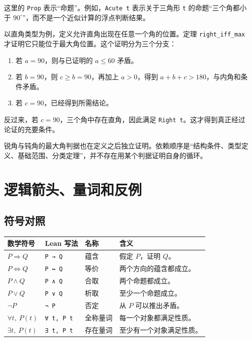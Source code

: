 \documentclass[UTF8,a4paper,zihao=-4,oneside,openany,fontset=fandol]{ctexbook}
\theoremstyle{definition}
\theoremstyle{remark}
\begin{document}
这里的 \texttt{Prop} 表示“命题”。例如，\texttt{Acute t} 表示关于三角形 \texttt{t} 的命题“三个角都小于 $90^\circ$”，而不是一个近似计算的浮点判断结果。

以直角类型为例，定义允许直角出现在任意一个角的位置。定理 \texttt{right\_iff\_max} 才证明它只能位于最大角位置。这个证明分为三个分支：
\begin{enumerate}
\item 若 $a=90$，则与已证明的 $a\le60$ 矛盾。
\item 若 $b=90$，则 $c\ge b=90$，再加上 $a>0$，得到 $a+b+c>180$，与内角和条件矛盾。
\item 若 $c=90$，已经得到所需结论。
\end{enumerate}
反过来，若 $c=90$，三个角中存在直角，因此满足 \texttt{Right t}。这才得到真正经过论证的充要条件。

锐角与钝角的最大角判据也在定义之后独立证明。依赖顺序是“结构条件、类型定义、基础范围、分类定理”，并不存在用某个判据证明自身的循环。

\section{逻辑箭头、量词和反例}

\subsection{符号对照}

\begin{center}
\begin{tabularx}{\textwidth}{@{}lllX@{}}
\toprule
数学符号 & Lean 写法 & 名称 & 含义\\
\midrule
$P\Rightarrow Q$ & \texttt{P → Q} & 蕴含 & 假定 $P$，证明 $Q$。\\
$P\Leftrightarrow Q$ & \texttt{P ↔ Q} & 等价 & 两个方向的蕴含都成立。\\
$P\land Q$ & \texttt{P ∧ Q} & 合取 & 两个命题都成立。\\
$P\lor Q$ & \texttt{P ∨ Q} & 析取 & 至少一个命题成立。\\
$\neg P$ & \texttt{¬ P} & 否定 & 从 $P$ 可以推出矛盾。\\
$\forall t,\ P(t)$ & \texttt{∀ t, P t} & 全称量词 & 每一个对象都满足性质。\\
$\exists t,\ P(t)$ & \texttt{∃ t, P t} & 存在量词 & 至少有一个对象满足性质。\\
\bottomrule
\end{tabularx}
\end{center}
\end{document}

